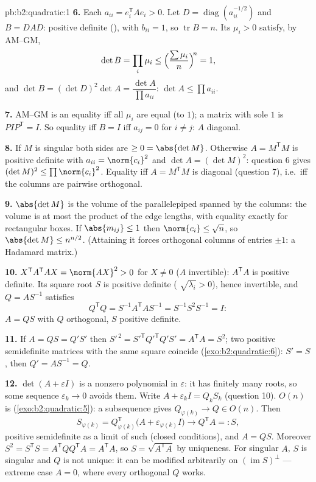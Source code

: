 \begin{solution}{pb:b2:quadratic:1}
\textbf{6.} Each $a_{ii} = e_i^{\mathsf T}Ae_i > 0$. Let $D =
\operatorname{diag}(a_{ii}^{-1/2})$ and $B = DAD$: positive
definite (), with $b_{ii} = 1$, so $\operatorname{tr}
B = n$. Its  $\mu_i > 0$ satisfy, by AM--GM,
\[
\det B = \prod_i\mu_i
\leq \Bigl(\frac{\sum\mu_i}{n}\Bigr)^{\!n} = 1 ,
\]
and $\det B = (\det D)^2\det A = \dfrac{\det A}{\prod
a_{ii}}$: $\det A \leq \prod a_{ii}$.

\textbf{7.} AM--GM is an equality iff all $\mu_i$ are equal
(to $1$); a  matrix with sole  $1$ is
$PIP^{\mathsf T} = I$. So equality iff $B = I$ iff $a_{ij} = 0$
for $i \neq j$: $A$ diagonal.

\textbf{8.} If $M$ is singular both sides are $\geq 0 =
\abs{\det M}$. Otherwise $A = M^{\mathsf T}M$ is positive
definite with $a_{ii} = \norm{c_i}^2$ and $\det A = (\det
M)^2$: question 6 gives $(\det M)^2 \leq \prod\norm{c_i}^2$.
Equality iff $A = M^{\mathsf T}M$ is diagonal (question 7),
i.e.\ iff the columns are pairwise orthogonal.

\textbf{9.} $\abs{\det M}$ is the volume of the parallelepiped
spanned by the columns: the volume is at most the product of
the edge lengths, with equality exactly for rectangular boxes.
If $\abs{m_{ij}} \leq 1$ then $\norm{c_i} \leq \sqrt n$, so
$\abs{\det M} \leq n^{n/2}$. (Attaining it forces orthogonal
columns of entries $\pm1$: a Hadamard matrix.)

\textbf{10.} $X^{\mathsf T}A^{\mathsf T}AX = \norm{AX}^2 > 0$
for $X \neq 0$ ($A$ invertible): $A^{\mathsf T}A$ is positive
definite. Its square root $S$ is positive definite (
$\sqrt{\lambda_i} > 0$), hence invertible, and $Q = AS^{-1}$
satisfies
\[
Q^{\mathsf T}Q = S^{-1}A^{\mathsf T}AS^{-1}
= S^{-1}S^2S^{-1} = I :
\]
$A = QS$ with $Q$ orthogonal, $S$ positive definite.

\textbf{11.} If $A = QS = Q'S'$ then $S'^{\,2} =
S'^{\mathsf T}Q'^{\mathsf T}Q'S' = A^{\mathsf T}A = S^2$; two
positive semidefinite matrices with the same square coincide
(\cref{exo:b2:quadratic:6}): $S' = S$, then $Q' = AS^{-1} =
Q$.

\textbf{12.} $\det(A + \varepsilon I)$ is a nonzero polynomial
in $\varepsilon$: it has finitely many roots, so some sequence
$\varepsilon_k \to 0$ avoids them. Write $A + \varepsilon_kI =
Q_kS_k$ (question 10). $O(n)$ is 
(\cref{exo:b2:quadratic:5}): a subsequence gives $Q_{\varphi(k)}
\to Q \in O(n)$. Then
\[
S_{\varphi(k)} = Q_{\varphi(k)}^{\mathsf T}
\bigl(A + \varepsilon_{\varphi(k)}I\bigr)
\longrightarrow Q^{\mathsf T}A =: S,
\]
 positive semidefinite as a limit of such (closed
conditions), and $A = QS$. Moreover $S^2 = S^{\mathsf T}S =
A^{\mathsf T}QQ^{\mathsf T}A = A^{\mathsf T}A$, so $S =
\sqrt{A^{\mathsf T}A}$ by uniqueness. For singular $A$, $S$ is
singular and $Q$ is not unique: it can be modified arbitrarily
on $(\operatorname{im} S)^{\perp}$ --- extreme case $A = 0$,
where every orthogonal $Q$ works.


\end{solution}
